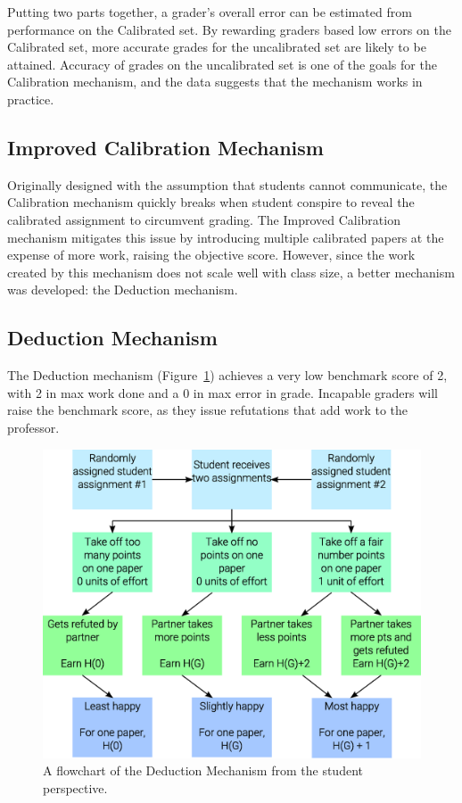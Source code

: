 \documentclass{chi-ext}
\begin{document}
Putting two parts together, a grader's overall error can be estimated from performance on the Calibrated set. By rewarding graders based low errors on the Calibrated set, more accurate grades for the uncalibrated set are likely to be attained. Accuracy of grades on the uncalibrated set is one of the goals for the Calibration mechanism, and the data suggests that the mechanism works in practice.

\subsection{Improved Calibration Mechanism}
Originally designed with the assumption that students cannot communicate, the Calibration mechanism quickly breaks when student conspire to reveal the calibrated assignment to circumvent grading. The Improved Calibration mechanism mitigates this issue by introducing multiple calibrated papers at the expense of more work, raising the objective score. However, since the work created by this mechanism does not scale well with class size, a better mechanism was developed: the Deduction mechanism.

\subsection{Deduction Mechanism}

The Deduction mechanism (Figure~\ref{fig:deduction}) achieves a very low benchmark score of 2, with 2 in max work done and a 0 in max error in grade. Incapable graders will raise the benchmark score, as they issue refutations that add work to the professor.

\begin{figure}
  \centering
  \includegraphics[width=\linewidth]{Deduction-Flowchart.eps}
  \caption{A flowchart of the Deduction Mechanism from the student perspective.}
  \label{fig:deduction}
\end{figure}
\end{document}
